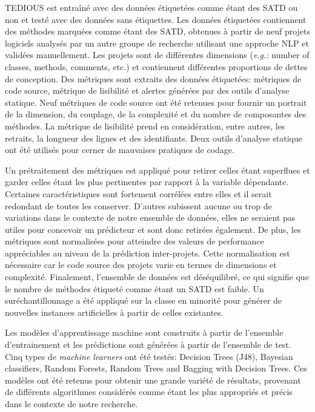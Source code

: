 \ac{TEDIOUS} est entra\^{i}n\'{e} avec des donn\'{e}es \'{e}tiquet\'{e}es comme \'{e}tant des \ac{SATD} ou non et test\'{e} avec des donn\'{e}es sans \'{e}tiquettes. Les donn\'{e}es \'{e}tiquet\'{e}es contiennent des m\'{e}thodes marqu\'{e}es comme \'{e}tant des \ac{SATD}, obtenues \`{a} partir de neuf projets logiciels analys\'{e}s par un autre groupe de recherche utilisant une approche \ac{NLP} et valid\'{e}es manuellement. Les projets sont de diff\'{e}rentes dimensions (\emph{e.g.:} number of classes, methods, comments, etc.) et contiennent diff\'{e}rentes proportions de dettes de conception. Des m\'{e}triques sont extraits des donn\'{e}es \'{e}tiquet\'{e}es: m\'{e}triques de code source, m\'{e}trique  de lisibilit\'{e} et alertes g\'{e}n\'{e}r\'{e}es par des outils d'analyse statique. Neuf m\'{e}triques de code source ont \'{e}t\'{e} retenues pour fournir un portrait de la dimension, du couplage, de la complexit\'{e} et du nombre de composantes des m\'{e}thodes. La m\'{e}trique de lisibilit\'{e} prend en consid\'{e}ration, entre autres, les retraits, la longueur des lignes et des identifiants. Deux outils d'analyse statique ont \'{e}t\'{e} utilis\'{e}s pour cerner de mauvaises pratiques de codage. \par

Un pr\'{e}traitement des m\'{e}triques est appliqu\'{e} pour retirer celles \'{e}tant superflues et garder celles \'{e}tant les plus pertinentes par rapport \`{a} la variable d\'{e}pendante. Certaines caract\'{e}ristiques sont fortement corr\'{e}l\'{e}es entre elles et il serait redondant de toutes les conserver. D'autres subissent aucune ou trop de variations dans le contexte de notre ensemble de donn\'{e}es, elles ne seraient pas utiles pour concevoir un pr\'{e}dicteur et sont donc retir\'{e}es \'{e}galement. De plus, les m\'{e}triques sont normalis\'{e}es pour atteindre des valeurs de performance appr\'{e}ciables au niveau de la pr\'{e}diction inter-projets. Cette normalisation est n\'{e}cessaire car le code source des projets varie en termes de dimensions et complexit\'{e}. Finalement, l'ensemble de donn\'{e}es est d\'{e}s\'{e}quilibr\'{e}, ce qui signifie que le nombre de m\'{e}thodes \'{e}tiquet\'{e} comme \'{e}tant un \ac{SATD} est faible. Un sur\'{e}chantillonnage a \'{e}t\'{e} appliqu\'{e} sur la classe en minorit\'{e} pour g\'{e}n\'{e}rer de nouvelles instances artificielles \`{a} partir de celles existantes. \par

Les mod\`{e}les d'apprentissage machine sont construits \`{a} partir de l'ensemble d'entrainement et les pr\'{e}dictions sont g\'{e}n\'{e}r\'{e}es \`{a} partir de l'ensemble de test. Cinq types de \emph{machine learners} ont \'{e}t\'{e} test\'{e}s: Decision Trees (J48), Bayesian classifiers, Random Forests, Random Trees and Bagging with Decision Trees. Ces mod\`{e}les ont \'{e}t\'{e} retenus pour obtenir une grande vari\'{e}t\'{e} de r\'{e}sultats, provenant de diff\'{e}rents algorithmes consid\'{e}r\'{e}s comme \'{e}tant les plus appropri\'{e}s et pr\'{e}cis dans le contexte de notre recherche. \par

